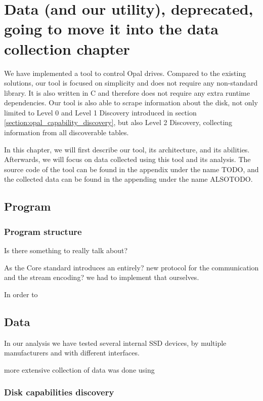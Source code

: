 \chapter{Data (and our utility), deprecated, going to move it into the data collection chapter}

We have implemented a tool to control Opal drives.
Compared to the existing solutions, our tool is focused on simplicity and does not require any non-standard library. It is also written in C and therefore does not require any extra runtime dependencies. 
Our tool is also able to scrape information about the disk, not only limited to Level 0 and Level 1 Discovery introduced in section \ref{section:opal_capability_discovery}, but also Level 2 Discovery, collecting information from all discoverable tables.

In this chapter, we will first describe our tool, its architecture, and its abilities. 
Afterwards, we will focus on data collected using this tool and its analysis. 
The source code of the tool can be found in the appendix under the name TODO, and the collected data can be found in the appending under the name ALSOTODO.

\section{Program}

\subsection{Program structure}






Is there something to really talk about? 

As the Core standard introduces an entirely? new protocol for the communication and the stream encoding? we had to implement that ourselves.

In order to 

\section{Data}

In our analysis we have tested several internal SSD devices, by multiple manufacturers and with different interfaces.

more extensive collection of data was done using 


\subsection{Disk capabilities discovery}


